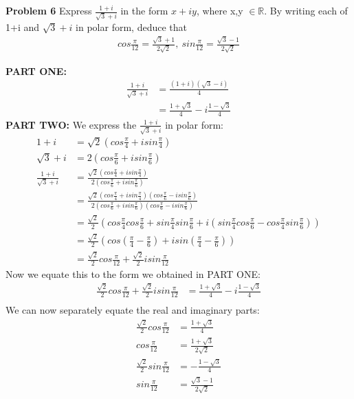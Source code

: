 \documentclass[12pt,letterpaper]{hmcpset}
\begin{document}
\begin{problem}\textbf{Problem 6}
Express $\frac{1+i}{\sqrt{3}+i}$ in the form $x+iy$, where x,y $\in\mathbb{R}$. By writing each of 1+i and $\sqrt{3}+i$ in polar form, deduce that
\begin{align*}
cos\frac{\pi}{12}=\frac{\sqrt{3}+1}{2\sqrt{2}},\ sin\frac{\pi}{12}=\frac{\sqrt{3}-1}{2\sqrt{2}}
\end{align*}
\end{problem}

\begin{solution}
\textbf{PART ONE:} 
\begin{align*}
\frac{1+i}{\sqrt{3}+i}	&= \frac{(1+i)(\sqrt{3} - i)}{4}	\\
						&= \frac{1+\sqrt{3}}{4} - i\frac{1-\sqrt{3}}{4}
\end{align*}
\textbf{PART TWO:} We express the $\frac{1+i}{\sqrt{3}+i}$ in polar form:
\begin{align*}
1 + i &= \sqrt{2}(cos\frac{\pi}{4} + isin\frac{\pi}{4})	\\
\sqrt{3} + i 	&= 2(cos\frac{\pi}{6} + isin\frac{\pi}{6})	\\
\frac{1+i}{\sqrt{3}+i}	&= \frac{\sqrt{2}(cos\frac{\pi}{4} + isin\frac{\pi}{4})}{2(cos\frac{\pi}{6} + isin\frac{\pi}{6})}	\\
						&=  \frac{\sqrt{2}(cos\frac{\pi}{4} + isin\frac{\pi}{4})(cos\frac{\pi}{6} - isin\frac{\pi}{6})}{2(cos\frac{\pi}{6} + isin\frac{\pi}{6})(cos\frac{\pi}{6} - isin\frac{\pi}{6})}\\
						&= \frac{\sqrt{2}}{2}(cos\frac{\pi}{4}cos\frac{\pi}{6} + sin\frac{\pi}{4}sin\frac{\pi}{6} + i(sin\frac{\pi}{4}cos\frac{\pi}{6} - cos\frac{\pi}{4}sin\frac{\pi}{6}))\\
						&= \frac{\sqrt{2}}{2}(cos(\frac{\pi}{4} - \frac{\pi}{6}) + isin(\frac{\pi}{4}-\frac{\pi}{6}))\\
						&= \frac{\sqrt{2}}{2}cos\frac{\pi}{12} + \frac{\sqrt{2}}{2}isin\frac{\pi}{12}
\end{align*}
Now we equate this to the form we obtained in PART ONE:
\begin{align*}
\frac{\sqrt{2}}{2}cos\frac{\pi}{12} + \frac{\sqrt{2}}{2}isin\frac{\pi}{12}	&= \frac{1+\sqrt{3}}{4} - i\frac{1-\sqrt{3}}{4}	\\
\end{align*}
We can now separately equate the real and imaginary parts:
\begin{align*}
\frac{\sqrt{2}}{2}cos\frac{\pi}{12}	&= \frac{1+\sqrt{3}}{4} 	\\
cos\frac{\pi}{12}	&= \frac{1+\sqrt{3}}{2\sqrt{2}}	\\
\frac{\sqrt{2}}{2}sin\frac{\pi}{12}	&= - \frac{1-\sqrt{3}}{4}	\\
sin\frac{\pi}{12}	&= \frac{\sqrt{3}-1}{2\sqrt{2}}	\\
\end{align*}
\end{solution}
\end{document}
